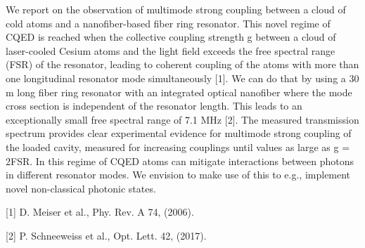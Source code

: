 \documentclass{scdpg}
\begin{document}
\begin{scAbstract}
{}
\scBeginText
We report on the observation of multimode strong coupling between a cloud of cold atoms and a nanofiber-based fiber ring resonator.
This novel regime of CQED is reached when the collective coupling strength g between a cloud of laser-cooled Cesium atoms and the light field exceeds the free spectral range (FSR) of the resonator, leading to coherent coupling of the atoms with more than one longitudinal resonator mode simultaneously [1].
We can do that by using a 30 m long fiber ring resonator with an integrated optical nanofiber where the mode cross section is independent of the resonator length. This leads to an exceptionally small free spectral range of 7.1 MHz [2].
The measured transmission spectrum provides clear experimental evidence for multimode strong coupling of the loaded cavity, measured for increasing couplings until values as large as g = 2FSR.
In this regime of CQED atoms can mitigate interactions between photons in different resonator modes.
We envision to make use of this to e.g., implement novel non-classical photonic states.

[1] D. Meiser et al., Phy. Rev. A 74, (2006).

[2]  P. Schneeweiss et al., Opt. Lett. 42, (2017).
\scEndText
{}
\end{scAbstract}
\end{document}
